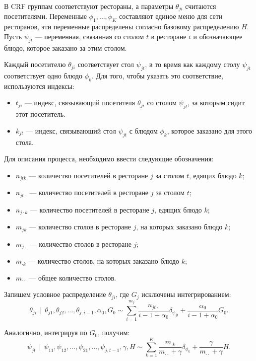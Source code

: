 \documentclass[12pt, a4paper]{article}
\DeclareMathOperator{\svert}{\,\vert\,}
\begin{document}
  В CRF группам соответствуют рестораны, а параметры $\theta_{ji}$ считаются посетителями. Переменные $\phi_1, \ldots, \phi_K$ составляют единое меню для сети ресторанов, эти переменные распределены согласно базовому распределению $H$. Пусть $\psi_{jt}$ --- переменная, связанная со столом $t$ в ресторане $i$ и обозначающее блюдо, которое заказано за этим столом.
  
  Каждый посетителю $\theta_{ji}$ соответствует стол $\psi_{jt}$, в то время как каждому столу $\psi_{jt}$ соответствует одно блюдо $\phi_k$. Для того, чтобы указать это соответствие, используются индексы:
  \begin{itemize}
  	\item $t_{ji}$ --- индекс, связывающий посетителя $\theta_{ji}$ со столом $\psi_{jt}$, за которым сидит этот посетитель.
  	\item $k_{jt}$ --- индекс, связывающий стол $\psi_{jt}$ с блюдом $\phi_k$, которое заказано для этого стола.
  \end{itemize}
  Для описания процесса, необходимо ввести следующие обозначения:
  \begin{itemize}
  \item $n_{jtk}$ --- количество посетителей в ресторане $j$ за столом $t$, едящих блюдо $k$;
  \item $n_{jt\cdot}$ --- количество посетителей в ресторане $j$ за столом $t$;
  \item $n_{j\cdot k}$ --- количество посетителей в ресторане $j$, едящих блюдо $k$;
  \item $m_{jk}$ --- количество столов в ресторане $j$, на которых заказано блюдо $k$;
  \item $m_{j\cdot}$ --- количество столов в ресторане $j$;
  \item $m_{\cdot k}$ --- количество столов, на которых заказано блюдо $k$;
  \item $m_{\cdot \cdot}$ --- общее количество столов.
  \end{itemize}
  
  Запишем условное распределение $\theta_{ji}$, где $G_j$ исключены интегрированием:
  \begin{equation}
  \label{eq:1}
  \theta_{ji} \svert \theta_{j1}, \theta_{j2}, \ldots, \theta_{j,i-1}, \alpha_0, G_0 \sim
  \sum \limits_{i=1}^{m_j} \frac{n_{j t \cdot}}{i - 1 + \alpha_0} \delta_{\psi_{jt}} + \frac{\alpha_0}{i - 1 + \alpha_0} G_0.
  \end{equation}
  
  Аналогично, интегрируя по $G_0$, получим:
  \begin{equation}
  \label{eq:2}
  \psi_{jt} \svert \psi_{11}, \psi_{12}, \ldots, \psi_{21}, \ldots, \psi_{j, t-1}, \gamma, H \sim
  \sum \limits_{k=1}^{K} \frac{m_{\cdot k}}{m_{\cdot \cdot} + \gamma} \delta_{\phi_k} + \frac{\gamma}{m_{\cdot \cdot} + \gamma} H.
  \end{equation}
  
\end{document}

